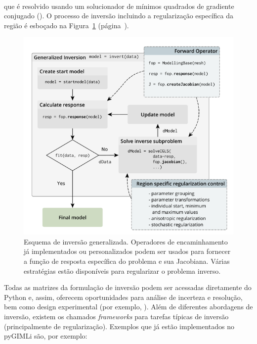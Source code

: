 \documentclass[a4paper, 12 pt]{article} %
\begin{document}
\begin{itemize}
\begin{equation}
\begin{matrix}
	\end{matrix}
	\end{equation}
	
	que é resolvido usando um solucionador de mínimos quadrados de gradiente conjugado (\citealp{gunther2006three}). O processo de inversão incluindo a regularização específica da região é esboçado na Figura~\ref{inversao} (página~\pageref{inversao}).
	
	\begin{figure}[!hbtp]
		\begin{center}
			\includegraphics[scale=0.6]{Figuras/inversao.png}
		\end{center}
		\caption{Esquema de inversão generalizada. Operadores de encaminhamento já implementados ou personalizados podem ser usados para fornecer a função de resposta específica do problema e sua Jacobiana. Várias estratégias estão disponíveis para regularizar o problema inverso.}
		\label{inversao}
	\end{figure}

	\hspace{0.5cm} Todas as matrizes da formulação de inversão podem ser acessadas diretamente do Python e, assim, oferecem oportunidades para análise de incerteza e resolução, bem como design experimental (por exemplo, \citealp{wagner2015constructive}). Além de diferentes abordagens de inversão, existem os chamados \textit{frameworks} para tarefas típicas de inversão (principalmente de regularização). Exemplos que já estão implementados no pyGIMLi são, por exemplo:
	

\end{itemize}
\end{document}
